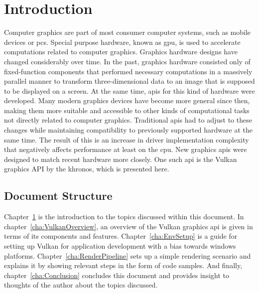 
\chapter{Introduction}
\label{cha:Introduction}
  Computer graphics are part of most consumer computer systems, such as mobile devices or \glspl{pc}.
  Special purpose hardware, known as \gls{gpu}, is used to accelerate computations related to computer graphics.
  Graphics hardware designs have changed considerably over time.
  In the past, graphics hardware consisted only of fixed-function components that performed necessary computations in a massively parallel manner to transform three-dimensional data to an image that is supposed to be displayed on a screen.
  At the same time, \glspl{api} for this kind of hardware were developed.
  Many modern graphics devices have become more general since then, making them more suitable and accessible to other kinds of computational tasks not directly related to computer graphics.
  Traditional \glspl{api} had to adjust to these changes while maintaining compatibility to previously supported hardware at the same time.
  The result of this is an increase in driver implementation complexity that negatively affects performance at least on the \gls{cpu}.
  New graphics \glspl{api} were designed to match recent hardware more closely.
  One such \gls{api} is the Vulkan graphics API by the \gls{khronos}, which is presented here.


  \section{Document Structure}
    Chapter~\ref{cha:Introduction} is the introduction to the topics discussed within this document.
    In chapter~\ref{cha:VulkanOverview}, an overview of the Vulkan graphics \gls{api} is given in terms of its components and features.
    Chapter~\ref{cha:EnvSetup} is a guide for setting up Vulkan for application development with a bias towards \gls{windows} platforms.
    Chapter~\ref{cha:RenderPipeline} sets up a simple rendering scenario and explains it by showing relevant steps in the form of code samples.
    And finally, chapter~\ref{cha:Conclusion} concludes this document and provides insight to thoughts of the author about the topics discussed.
